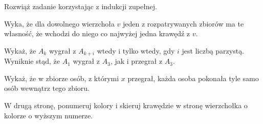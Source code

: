 
\begin{hints_list}
	\item *
	\item Rozwiąż zadanie korzystając z indukcji zupełnej.
	\item Wyka, że dla dowolnego wierzchoła $v$ jeden z rozpatrywanych zbiorów ma te własność, że wchodzi do niego co najwyżej jedna krawędź z $v$.
	\item Wykaż, że $A_k$ wygrał z $A_{k + i}$ wtedy i tylko wtedy, gdy $i$ jest liczbą parzystą. Wyniknie stąd, że $A_1$ wygrał z $A_3$, jak i przegrał z $A_3$.
	\item Wykaż, że w zbiorze osób, z którymi $x$ przegrał, każda osoba pokonała tyle samo osób wewnątrz tego zbioru.
	\item W drugą stronę, ponumeruj kolory i skieruj krawędzie w stronę wierzchołka o kolorze o wyższym numerze.
\end{hints_list}